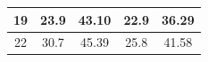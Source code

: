 \documentclass{article}
\begin{document}
\begin{Large}
\begin{table}[h]
\begin{tabular}{|c|cc|cc|}
19                                                                       & \multicolumn{1}{c|}{23.9}                                                    & 43.10                                                       & \multicolumn{1}{c|}{22.9}                                                    & 36.29                                                       \\ \hline
22                                                                       & \multicolumn{1}{c|}{30.7}                                                    & 45.39                                                       & \multicolumn{1}{c|}{25.8}                                                    & 41.58                                                       \\ \hline
\end{tabular}
\end{table}



\end{Large}
\end{document}

